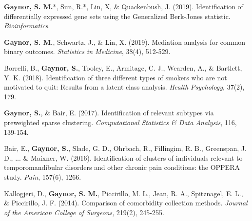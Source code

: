 

\begin{cvpapers}

\cvpaper
{\textbf{Gaynor, S. M.}*, Sun, R.*, Lin, X, \& Quackenbush, J. (2019). Identification of differentially expressed gene sets using the Generalized Berk-Jones statistic. \textit{Bioinformatics}.} %
{} %
{ } %
{} %

\cvpaper
    {\textbf{Gaynor, S. M.}, Schwartz, J., \& Lin, X. (2019). Mediation analysis for common binary outcomes. \textit{Statistics in Medicine}, 38(4), 512-529.} %
    {} %
    { } %
    {} %
    
    \cvpaper
    {Borrelli, B., \textbf{Gaynor, S.}, Tooley, E., Armitage, C. J., Wearden, A., \& Bartlett, Y. K. (2018). Identification of three different types of smokers who are not motivated to quit: Results from a latent class analysis. \textit{Health Psychology}, 37(2), 179.} %
    {} %
    { } %
    {} %
    
    
  \cvpaper
    {\textbf{Gaynor, S.}, \& Bair, E. (2017). Identification of relevant subtypes via preweighted sparse clustering. \textit{Computational Statistics \& Data Analysis}, 116, 139-154.} %
    {} %
    { } %
    {} %
    
 \cvpaper
    {Bair, E., \textbf{Gaynor, S.}, Slade, G. D., Ohrbach, R., Fillingim, R. B., Greenspan, J. D., ... \& Maixner, W. (2016). Identification of clusters of individuals relevant to temporomandibular disorders and other chronic pain conditions: the OPPERA study. \textit{Pain}, 157(6), 1266.} %
    {} %
    { } %
    {} %
    
 \cvpaper
    {Kallogjeri, D., \textbf{Gaynor, S. M.}, Piccirillo, M. L., Jean, R. A., Spitznagel, E. L., \& Piccirillo, J. F. (2014). Comparison of comorbidity collection methods. \textit{Journal of the American College of Surgeons}, 219(2), 245-255.} %
    {} %
    { } %
    {} %
    

\end{cvpapers}

